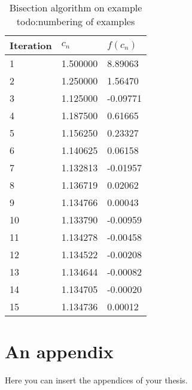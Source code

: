 \documentclass[
  digital, %
  table,   %
  nolof,     %
  nolot,     %
	draft, %
]{fithesis3}
\begin{document}
\begin{table}
  \begin{tabularx}{\textwidth}{lll}
    \toprule
    Iteration & $c_{n}$ & $f(c_{n})$\\
    \midrule
    1 & 1.500000 & 8.89063 \\
    2 & 1.250000 & 1.56470 \\
    3 & 1.125000 & -0.09771 \\
    4 & 1.187500 & 0.61665 \\
    5 & 1.156250 & 0.23327 \\
    6 & 1.140625 & 0.06158 \\
    7 & 1.132813 & -0.01957 \\
    8 & 1.136719 & 0.02062 \\
    9 & 1.134766 & 0.00043 \\
    10 & 1.133790 & -0.00959 \\
    11 & 1.134278 & -0.00458 \\
    12 & 1.134522 & -0.00208 \\
    13 & 1.134644 & -0.00082 \\
    14 & 1.134705 & -0.00020 \\
    15 & 1.134736 & 0.00012 \\
    \bottomrule
  \end{tabularx}
  \caption{Bisection algorithm on example todo:numbering of examples}
  \label{tab:bis}
\end{table}


\printbibliography[heading=bibintoc]


  \makeatletter\thesis@blocks@clear\makeatother
  \printindex

\appendix %
\chapter{An appendix}
Here you can insert the appendices of your thesis.
\end{document}
